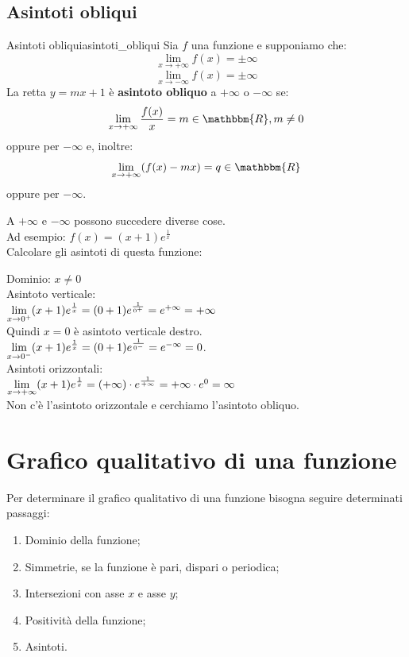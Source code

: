 \documentclass[12pt]{report}
\newcounter{definition}
\newcounter{exercise}
\newcommand{\nmu}{}
\begin{document}
  	\subsection{Asintoti obliqui}
  	\begin{definition}{\nmu Asintoti obliqui}{asintoti_obliqui}
  		Sia $f$ una funzione e supponiamo che:
  		\[
  		\lim_{x \to +\infty}f(x) = \pm\infty
  		\]
  		\[
  		\lim_{x \to -\infty}f(x) = \pm\infty
  		\]
  		La retta $y = mx + 1$ è \textbf{asintoto obliquo} a $+\infty$ o $-\infty$ se:
  		\[
  		\lim_{x \to +\infty}\frac{f(x)}{x} = m \in \mathbbm{R}, m \neq 0
  		\]
  		oppure per $-\infty$ e, inoltre:
  		\[
  		\lim_{x \to +\infty}(f(x) - mx) = q \in \mathbbm{R}
  		\]
  		oppure per $-\infty$.

  	\end{definition}
  	\begin{note}{}{}
  		A $+\infty$ e $-\infty$ possono succedere diverse cose. \\
  		Ad esempio: $f(x) = (x + 1)e^{\frac{1}{x}}$ \\
  		Calcolare gli asintoti di questa funzione:
  		\begin{exercise}{}{}
  			Dominio: $x \neq 0$ \\
  			Asintoto verticale: \\
  			$\mathlarger{\lim_{x \to 0^+}}(x + 1)e^{\frac{1}{x}} = (0 + 1)e^{\frac{1}{0^+}} = e^{+\infty} = +\infty$  \\
  			Quindi $x = 0$ è asintoto verticale destro. \\
  			$\mathlarger{\lim_{x \to 0^-}}(x + 1)e^{\frac{1}{x}} = (0 + 1)e^{\frac{1}{0^-}} = e^{-\infty} = 0$. \\
  			Asintoti orizzontali: \\
  			$\mathlarger{\lim_{x \to +\infty}}(x + 1)e^{\frac{1}{x}} = (+\infty) \cdot e^{\frac{1}{+\infty}} = +\infty \cdot e^0 = \infty$ \\
  			Non c'è l'asintoto orizzontale e cerchiamo l'asintoto obliquo.
  		\end{exercise}
  	\end{note}
  	\section{Grafico qualitativo di una funzione}
  	Per determinare il grafico qualitativo di una funzione bisogna seguire determinati passaggi:
  	\begin{enumerate}
  		\item Dominio della funzione;
  		\item Simmetrie, se la funzione è pari, dispari o periodica;
  		\item Intersezioni con asse $x$ e asse $y$;
  		\item Positività della funzione;
  		\item Asintoti.
  	\end{enumerate}
\end{document}
